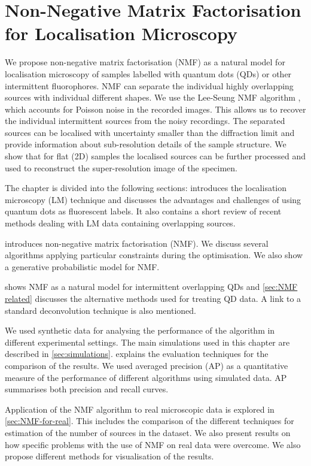 \chapter{Non-Negative Matrix Factorisation for Localisation Microscopy\label{ch:NMF}}

We propose non-negative matrix factorisation (NMF) as a natural model for localisation microscopy of samples labelled with quantum dots (QDs) or other intermittent fluorophores. NMF can separate the individual highly overlapping sources with individual different shapes. We use the Lee-Seung NMF algorithm \cite{Lee2001}, which accounts for Poisson noise in the recorded images. This allows us to recover the individual intermittent sources from the noisy recordings. The separated sources can be localised with uncertainty smaller than the diffraction limit and provide information about sub-resolution details of the sample structure. We show that for flat (2D) samples the localised sources can be further processed and used to reconstruct the super-resolution image of the specimen.

The chapter is divided into the following sections:  introduces the localisation microscopy (LM) technique and discusses the advantages and challenges of using quantum dots as fluorescent labels. It also contains a short review of recent methods dealing with LM data containing overlapping sources. 

 introduces non-negative matrix factorisation (NMF). We discuss several algorithms applying particular constraints during the optimisation. We also show a generative probabilistic model for NMF.

 shows NMF as a natural model for intermittent overlapping QDs and \autoref{sec:NMF related} discusses the alternative methods used for treating QD data. A link to a standard deconvolution technique is also mentioned. 

We used synthetic data for analysing the performance of the algorithm in different experimental settings. The main simulations used in this chapter are described in \autoref{sec:simulations}.  explains the evaluation techniques for the comparison of the results. We used averaged precision (AP) as a quantitative measure of the performance of different algorithms using simulated data. AP summarises both precision and recall curves.

Application of the NMF algorithm to real microscopic data is explored in \autoref{sec:NMF-for-real}. This includes the comparison of the different techniques for estimation of the number of sources in the dataset.  We also present results on how specific problems with the use of NMF on real data were overcome. We also propose different methods for visualisation of the results. 
	
